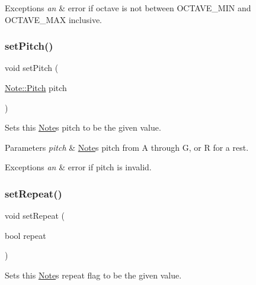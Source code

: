 \begin{DoxyExceptions}{Exceptions}
{\em an} & error if octave is not between O\+C\+T\+A\+V\+E\+\_\+\+M\+IN and O\+C\+T\+A\+V\+E\+\_\+\+M\+AX inclusive. \\
\hline
\end{DoxyExceptions}
\mbox{\label{classNote_afc6ff460b36c61aead47c60340789d00}} 
\subsubsection{\texorpdfstring{set\+Pitch()}{setPitch()}}
{\footnotesize\ttfamily void set\+Pitch (\begin{DoxyParamCaption}\item[{\mbox{\hyperlink{classNote_a6753778520a0d8493f6c18f6e6818542}{Note\+::\+Pitch}}}]{pitch }\end{DoxyParamCaption})}



Sets this \mbox{\hyperlink{classNote}{Note}}\textquotesingle{}s pitch to be the given value. 


\begin{DoxyParams}{Parameters}
{\em pitch} & \mbox{\hyperlink{classNote}{Note}}\textquotesingle{}s pitch from A through G, or R for a rest. \\
\hline
\end{DoxyParams}

\begin{DoxyExceptions}{Exceptions}
{\em an} & error if pitch is invalid. \\
\hline
\end{DoxyExceptions}
\mbox{\label{classNote_acbc8ea9a0222ced8202d9c739f9b5054}} 
\subsubsection{\texorpdfstring{set\+Repeat()}{setRepeat()}}
{\footnotesize\ttfamily void set\+Repeat (\begin{DoxyParamCaption}\item[{bool}]{repeat }\end{DoxyParamCaption})}



Sets this \mbox{\hyperlink{classNote}{Note}}\textquotesingle{}s repeat flag to be the given value. 


